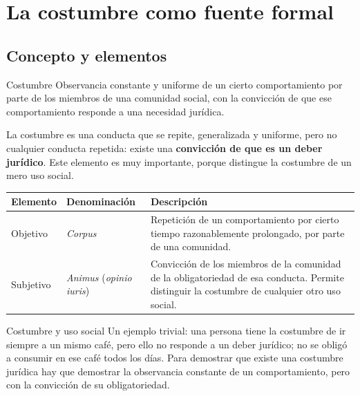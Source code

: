 \documentclass[12pt,oneside]{book}
\begin{document}
\chapter[La costumbre jurídica]{La costumbre como fuente formal}

\section{Concepto y elementos}

\begin{definition}{Costumbre}
Observancia constante y uniforme de un cierto comportamiento por parte de los miembros de una comunidad social, con la convicción de que ese comportamiento responde a una necesidad jurídica.
\end{definition}

La costumbre es una conducta que se repite, generalizada y uniforme, pero no cualquier conducta repetida: existe una \textbf{convicción de que es un deber jurídico}. Este elemento es muy importante, porque distingue la costumbre de un mero uso social.

\begin{table}[H]
\centering
\begin{tabularx}{\textwidth}{>{\raggedright\arraybackslash}p{} >{\raggedright\arraybackslash}p{} >{\raggedright\arraybackslash}X}
\toprule
\textbf{Elemento} & \textbf{Denominación} & \textbf{Descripción} \\
\midrule
Objetivo & \textit{Corpus} & Repetición de un comportamiento por cierto tiempo razonablemente prolongado, por parte de una comunidad. \\
\addlinespace
Subjetivo & \textit{Animus} (\textit{opinio iuris}) & Convicción de los miembros de la comunidad de la obligatoriedad de esa conducta. Permite distinguir la costumbre de cualquier otro uso social. \\
\bottomrule
\end{tabularx}
\end{table}

\begin{example}{Costumbre y uso social}
Un ejemplo trivial: una persona tiene la costumbre de ir siempre a un mismo café, pero ello no responde a un deber jurídico; no se obligó a consumir en ese café todos los días. Para demostrar que existe una costumbre jurídica hay que demostrar la observancia constante de un comportamiento, pero con la convicción de su obligatoriedad.
\end{example}
\end{document}
